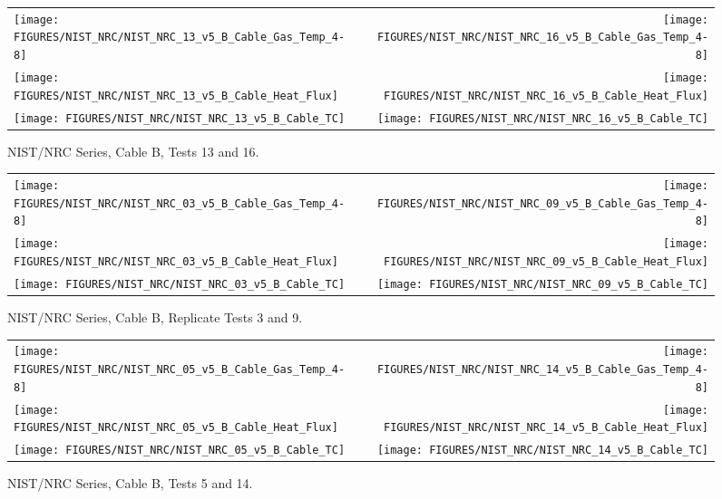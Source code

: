 \begin{figure}[h]
\begin{tabular*}{\textwidth}{l@{\extracolsep{\fill}}r}
\texttt{[image: FIGURES/NIST\_NRC/NIST\_NRC\_13\_v5\_B\_Cable\_Gas\_Temp\_4-8]} &
\texttt{[image: FIGURES/NIST\_NRC/NIST\_NRC\_16\_v5\_B\_Cable\_Gas\_Temp\_4-8]} \\
\texttt{[image: FIGURES/NIST\_NRC/NIST\_NRC\_13\_v5\_B\_Cable\_Heat\_Flux]} &
\texttt{[image: FIGURES/NIST\_NRC/NIST\_NRC\_16\_v5\_B\_Cable\_Heat\_Flux]} \\
\texttt{[image: FIGURES/NIST\_NRC/NIST\_NRC\_13\_v5\_B\_Cable\_TC]} &
\texttt{[image: FIGURES/NIST\_NRC/NIST\_NRC\_16\_v5\_B\_Cable\_TC]}
\end{tabular*}
\caption{NIST/NRC Series, Cable B, Tests 13 and 16.}
\label{NIST_NRC_B_13_and_16}
\end{figure}

\begin{figure}[h]
\begin{tabular*}{\textwidth}{l@{\extracolsep{\fill}}r}
\texttt{[image: FIGURES/NIST\_NRC/NIST\_NRC\_03\_v5\_B\_Cable\_Gas\_Temp\_4-8]} &
\texttt{[image: FIGURES/NIST\_NRC/NIST\_NRC\_09\_v5\_B\_Cable\_Gas\_Temp\_4-8]} \\
\texttt{[image: FIGURES/NIST\_NRC/NIST\_NRC\_03\_v5\_B\_Cable\_Heat\_Flux]} &
\texttt{[image: FIGURES/NIST\_NRC/NIST\_NRC\_09\_v5\_B\_Cable\_Heat\_Flux]} \\
\texttt{[image: FIGURES/NIST\_NRC/NIST\_NRC\_03\_v5\_B\_Cable\_TC]} &
\texttt{[image: FIGURES/NIST\_NRC/NIST\_NRC\_09\_v5\_B\_Cable\_TC]}
\end{tabular*}
\caption{NIST/NRC Series, Cable B, Replicate Tests 3 and 9.}
\label{NIST_NRC_B_3_and_9}
\end{figure}

\begin{figure}[h]
\begin{tabular*}{\textwidth}{l@{\extracolsep{\fill}}r}
\texttt{[image: FIGURES/NIST\_NRC/NIST\_NRC\_05\_v5\_B\_Cable\_Gas\_Temp\_4-8]} &
\texttt{[image: FIGURES/NIST\_NRC/NIST\_NRC\_14\_v5\_B\_Cable\_Gas\_Temp\_4-8]} \\
\texttt{[image: FIGURES/NIST\_NRC/NIST\_NRC\_05\_v5\_B\_Cable\_Heat\_Flux]} &
\texttt{[image: FIGURES/NIST\_NRC/NIST\_NRC\_14\_v5\_B\_Cable\_Heat\_Flux]} \\
\texttt{[image: FIGURES/NIST\_NRC/NIST\_NRC\_05\_v5\_B\_Cable\_TC]} &
\texttt{[image: FIGURES/NIST\_NRC/NIST\_NRC\_14\_v5\_B\_Cable\_TC]}
\end{tabular*}
\caption{NIST/NRC Series, Cable B, Tests 5 and 14.}
\label{NIST_NRC_B_5_and_14}
\end{figure}

